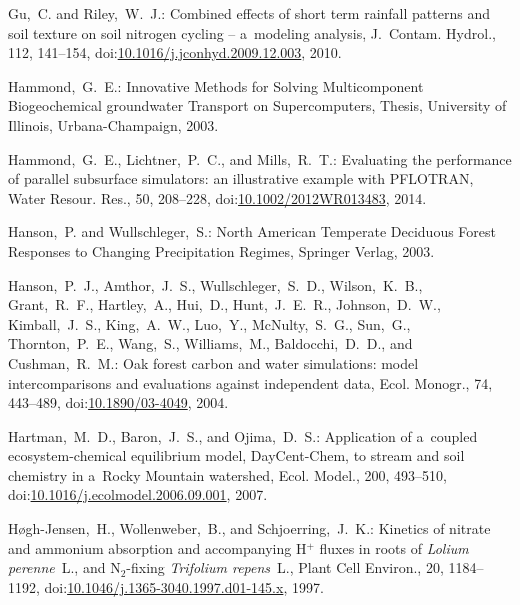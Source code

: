 \documentclass[gmdd, online, hvmath]{copernicus}
\begin{document}
\begin{thebibliography}{55}
Gu,~C. and Riley,~W.~J.:
Combined effects of short term rainfall patterns and soil texture on soil nitrogen cycling -- a~modeling analysis,
J.~Contam. Hydrol.,
112, 141--154,
doi:\href{http://dx.doi.org/10.1016/j.jconhyd.2009.12.003}{10.1016/j.jconhyd.2009.12.003}, 2010.


Hammond,~G.~E.:
Innovative Methods for Solving Multicomponent Biogeochemical groundwater Transport on Supercomputers,
Thesis,
University of Illinois, Urbana-Champaign, 2003.


Hammond,~G.~E., Lichtner,~P.~C., and Mills,~R.~T.:
Evaluating the performance of parallel subsurface simulators: an illustrative example with PFLOTRAN,
Water Resour. Res.,
50, 208--228,
doi:\href{http://dx.doi.org/10.1002/2012WR013483}{10.1002/2012WR013483}, 2014.


Hanson,~P. and Wullschleger,~S.:
North American Temperate Deciduous Forest Responses to Changing Precipitation Regimes,
Springer Verlag,  2003.


Hanson,~P.~J., Amthor,~J.~S., Wullschleger,~S.~D., Wilson,~K.~B., Grant,~R.~F., Hartley,~A., Hui,~D., Hunt,~J.~E.~R., Johnson,~D.~W., Kimball,~J.~S., King,~A.~W., Luo,~Y., McNulty,~S.~G., Sun,~G., Thornton,~P.~E., Wang,~S., Williams,~M., Baldocchi,~D.~D., and Cushman,~R.~M.:
Oak forest carbon and water simulations: model intercomparisons and evaluations against independent data,
Ecol. Monogr.,
74, 443--489,
doi:\href{http://dx.doi.org/10.1890/03-4049}{10.1890/03-4049}, 2004.


Hartman,~M.~D., Baron,~J.~S., and Ojima,~D.~S.:
Application of a~coupled ecosystem-chemical equilibrium model, DayCent-Chem, to stream and soil chemistry in a~Rocky Mountain watershed,
Ecol. Model.,
200, 493--510,
doi:\href{http://dx.doi.org/10.1016/j.ecolmodel.2006.09.001}{10.1016/j.ecolmodel.2006.09.001}, 2007.


H{\o}gh-Jensen,~H., Wollenweber,~B., and Schjoerring,~J.~K.: Kinetics of nitrate and ammonium absorption and accompanying H$^+$ fluxes in roots of \textit{Lolium perenne}~L., and N$_2$-fixing \textit{Trifolium repens}~L.,
Plant Cell Environ.,
20, 1184--1192,
doi:\href{http://dx.doi.org/10.1046/j.1365-3040.1997.d01-145.x}{10.1046/j.1365-3040.1997.d01-145.x}, 1997.



\end{thebibliography}
\end{document}
